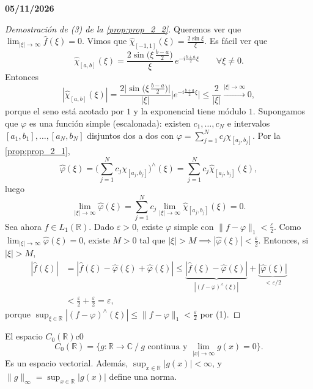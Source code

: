 \textbf{05/11/2026}

\begin{proof}[Demostración de (3) de la \cref{prop:prop_2_2}]
Queremos ver que $\lim_{|\xi|\to\infty}\hat{f}(\xi) = 0$. Vimos que $\hat{\chi}_{[-1,1]}(\xi) = \frac{2\sin\xi}{\xi}$. Es fácil ver que
\[
\hat{\chi}_{[a,b]}(\xi) = \frac{2\sin\big(\xi\,\frac{b-a}{2}\big)}{\xi}\,e^{-i\frac{b+a}{2}\xi} \qquad \forall\xi \ne 0.
\]
Entonces
\[
|\hat{\chi}_{[a,b]}(\xi)| = \frac{2\big|\sin\big(\xi\,\frac{b-a}{2}\big)\big|}{|\xi|}\big|e^{-i\frac{b+a}{2}\xi}\big| \le \frac{2}{|\xi|} \xrightarrow{|\xi|\to\infty} 0,
\]
porque el seno está acotado por $1$ y la exponencial tiene módulo $1$.
Supongamos que $\varphi$ es una función simple (escalonada): existen $c_1, \dots, c_N$ e intervalos $[a_1, b_1], \dots, [a_N, b_N]$ disjuntos dos a dos con $\varphi = \sum_{j=1}^{N}c_j\chi_{[a_j,b_j]}$. Por la \cref{prop:prop_2_1},
\[
\hat{\varphi}(\xi) = \Big(\sum_{j=1}^{N}c_j\chi_{[a_j,b_j]}\Big)^{\wedge}(\xi) = \sum_{j=1}^{N}c_j\hat{\chi}_{[a_j,b_j]}(\xi),
\]
luego
\[
\lim_{|\xi|\to\infty}\hat{\varphi}(\xi) = \sum_{j=1}^{N}c_j\lim_{|\xi|\to\infty}\hat{\chi}_{[a_j,b_j]}(\xi) = 0.
\]
Sea ahora $f \in L_1(\mathbb{R})$. Dado $\varepsilon > 0$, existe $\varphi$ simple con $\|f - \varphi\|_1 < \frac{\varepsilon}{2}$. Como $\lim_{|\xi|\to\infty}\hat{\varphi}(\xi) = 0$, existe $M > 0$ tal que $|\xi| > M \implies |\hat{\varphi}(\xi)| < \frac{\varepsilon}{2}$. Entonces, si $|\xi| > M$,
\begin{align*}
|\hat{f}(\xi)| &= |\hat{f}(\xi) - \hat{\varphi}(\xi) + \hat{\varphi}(\xi)| \le \underbrace{|\hat{f}(\xi) - \hat{\varphi}(\xi)|}_{|(f-\varphi)^{\wedge}(\xi)|} + \underbrace{|\hat{\varphi}(\xi)|}_{<\varepsilon/2} \\
&< \frac{\varepsilon}{2} + \frac{\varepsilon}{2} = \varepsilon,
\end{align*}
porque $\sup_{\xi\in\mathbb{R}}|(f-\varphi)^{\wedge}(\xi)| \le \|f - \varphi\|_1 < \frac{\varepsilon}{2}$ por (1).
\end{proof}

\begin{definicion}{El espacio $C_0(\mathbb{R})$}{c0}
\[
C_0(\mathbb{R}) = \Big\{g : \mathbb{R} \to \mathbb{C} \ \Big/\ g \text{ continua y } \lim_{|x|\to\infty}g(x) = 0\Big\}.
\]
Es un espacio vectorial. Además, $\sup_{x\in\mathbb{R}}|g(x)| < \infty$, y $\|g\|_\infty = \sup_{x\in\mathbb{R}}|g(x)|$ define una norma.
\end{definicion}

